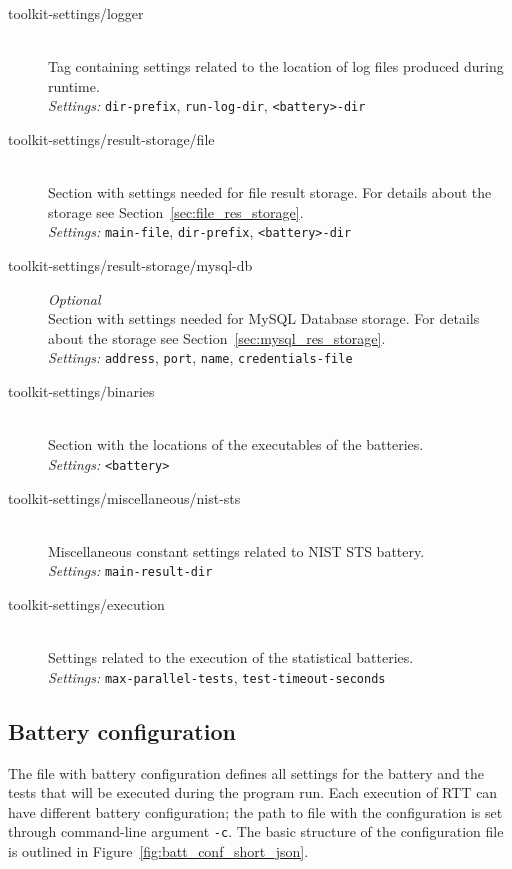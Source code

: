 \documentclass[
	digital,    %
	oneside,    %
	color,
	11pt,
	nocover,
	notable,
	nolof,
	nolot,
]{fithesis3}
\theoremstyle{definition}
\theoremstyle{remark}
\begin{document}
\begin{description}
\item[toolkit-settings/logger] \hfill \\
Tag containing settings related to the location of log files produced during runtime. \\
\textit{Settings: } \texttt{dir-prefix}, \texttt{run-log-dir}, \texttt{<battery>-dir}

\item[toolkit-settings/result-storage/file] \hfill \\
Section with settings needed for file result storage. For details about the storage see Section~\ref{sec:file_res_storage}. \\
\textit{Settings: } \texttt{main-file}, \texttt{dir-prefix}, \texttt{<battery>-dir}

\item[toolkit-settings/result-storage/mysql-db] \textit{Optional} \hfill \\
Section with settings needed for MySQL Database storage. For details about the storage see Section~\ref{sec:mysql_res_storage}. \\
\textit{Settings: } \texttt{address}, \texttt{port}, \texttt{name}, \texttt{credentials-file}

\item[toolkit-settings/binaries] \hfill \\
Section with the locations of the executables of the batteries. \\
\textit{Settings: } \texttt{<battery>}

\item[toolkit-settings/miscellaneous/nist-sts] \hfill \\
Miscellaneous constant settings related to NIST STS battery. \\
\textit{Settings: } \texttt{main-result-dir}

\item[toolkit-settings/execution] \hfill \\
Settings related to the execution of the statistical batteries. \\
\textit{Settings: } \texttt{max-parallel-tests}, \texttt{test-timeout-seconds}

\end{description}

\subsection{Battery configuration}
\label{sec:batt_conf}
The file with battery configuration defines all settings for the battery and the tests that will be executed during the program run. Each execution of RTT can have different battery configuration; the path to file with the configuration is set through command-line argument \texttt{-c}. The basic structure of the configuration file is outlined in Figure~\ref{fig:batt_conf_short_json}. 
\end{document}
